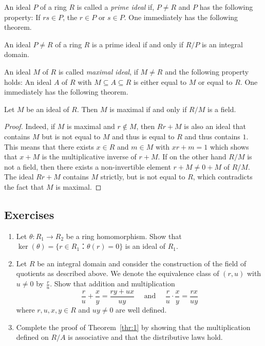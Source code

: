 An ideal $P$ of a ring $R$ is called a \emph{prime ideal} if, $P ≠R$ and $P$ has the following property: If $rs ∈P$, the $r ∈P$ or $s ∈P$. One immediately has the following theorem. 

\begin{theorem}
  \label{thr:3}
  An ideal $P ≠R$ of a ring $R$ is a prime ideal if and only if $R/P$ is an integral domain. 
\end{theorem}

An ideal $M$ of $R$ is called \emph{maximal ideal}, if $M ≠R$ and the following property holds: An ideal $A$ of $R$ with $M ⊆ A ⊆R$ is either equal to $M$ or equal to $R$. One immediately has the following theorem.

\begin{theorem}
  \label{thr:4}
  Let $M$ be an ideal of $R$. Then $M$ is maximal if and only if $R/M$ is a field. 
\end{theorem}
\begin{proof}
  \small Indeed, if $M$ is maximal and $r ∉ M$, then $Rr + M$ is also an ideal that contains $M$ but is not equal to $M$ and thus is equal to $R$ and thus contains $1$. This means that there exists $x ∈R$ and $m ∈M$ with $xr + m =1$ which shows that $x+M$ is the multiplicative inverse of $r+M$. If on the other hand $R/M$ is not a field, then there exists a non-invertible element $r + M ≠ 0+M$ of $R/M$. The ideal $Rr + M$ contains $M$ strictly, but is not equal to $R$, which contradicts the fact that $M$ is maximal. 
\end{proof}



\subsection*{Exercises}


\begin{enumerate}
\item Let $θ: R_1 → R_2$ be a ring homomorphism. Show that $\ker(θ) = \{ r ∈ R_1 ：θ(r) = 0 \}$ is an ideal of $R_1$. 
\item Let $R$ be an integral domain and consider the construction of the field  of quotients as described above. We denote the equivalence class of $(r,u)$ with $u ≠0$ by $\frac{r}{u}$. Show that addition and multiplication
  \begin{displaymath}
    \frac{r}{u} + \frac{x}{y} = \frac{ry + ux}{uy} \quad  \text{ and } \quad  \frac{r}{u} ⋅ \frac{x}{y} = \frac{rx}{uy} 
  \end{displaymath}
  where $r,u,x,y ∈R$ and $uy ≠0$ are well defined. 
\item Complete the proof of Theorem~\ref{thr:1} by showing that the multiplication defined on $R/A$ is associative and that the distributive laws hold.
\end{enumerate}



